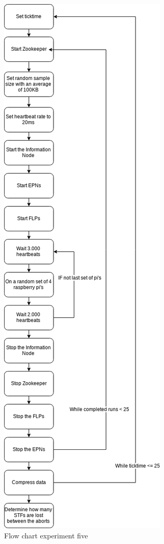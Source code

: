 \begin{figure}[htb]
	\includegraphics[width=\textwidth,height=\textheight,keepaspectratio]{./graphics/ex5.png}
	\caption{Flow chart experiment five}
	\label{fig:FlowChart5}
\end{figure}